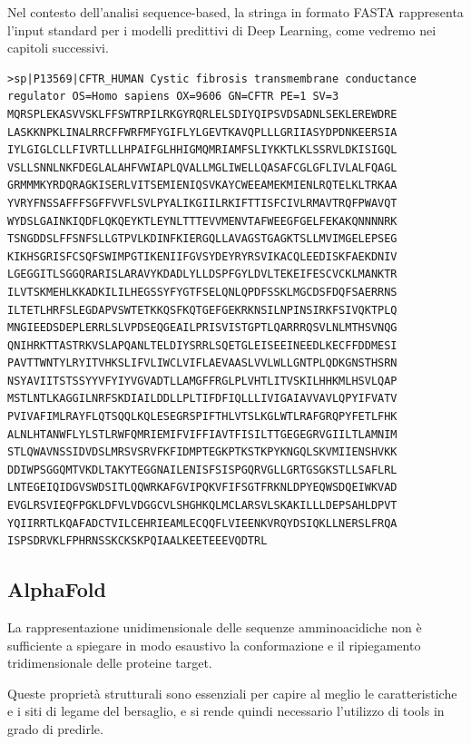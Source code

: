 Nel contesto dell'analisi sequence-based, la stringa in formato FASTA rappresenta l'input standard per i modelli predittivi di Deep Learning, come vedremo nei capitoli successivi.
\clearpage
\begin{lstlisting}[caption={Sequenza FASTA ufficiale della proteina CFTR (Cystic fibrosis transmembrane conductance regulator) umana (UniProt P13569).}, label={lst:fasta_cftr}]
>sp|P13569|CFTR_HUMAN Cystic fibrosis transmembrane conductance regulator OS=Homo sapiens OX=9606 GN=CFTR PE=1 SV=3
MQRSPLEKASVVSKLFFSWTRPILRKGYRQRLELSDIYQIPSVDSADNLSEKLEREWDRE
LASKKNPKLINALRRCFFWRFMFYGIFLYLGEVTKAVQPLLLGRIIASYDPDNKEERSIA
IYLGIGLCLLFIVRTLLLHPAIFGLHHIGMQMRIAMFSLIYKKTLKLSSRVLDKISIGQL
VSLLSNNLNKFDEGLALAHFVWIAPLQVALLMGLIWELLQASAFCGLGFLIVLALFQAGL
GRMMMKYRDQRAGKISERLVITSEMIENIQSVKAYCWEEAMEKMIENLRQTELKLTRKAA
YVRYFNSSAFFFSGFFVVFLSVLPYALIKGIILRKIFTTISFCIVLRMAVTRQFPWAVQT
WYDSLGAINKIQDFLQKQEYKTLEYNLTTTEVVMENVTAFWEEGFGELFEKAKQNNNNRK
TSNGDDSLFFSNFSLLGTPVLKDINFKIERGQLLAVAGSTGAGKTSLLMVIMGELEPSEG
KIKHSGRISFCSQFSWIMPGTIKENIIFGVSYDEYRYRSVIKACQLEEDISKFAEKDNIV
LGEGGITLSGGQRARISLARAVYKDADLYLLDSPFGYLDVLTEKEIFESCVCKLMANKTR
ILVTSKMEHLKKADKILILHEGSSYFYGTFSELQNLQPDFSSKLMGCDSFDQFSAERRNS
ILTETLHRFSLEGDAPVSWTETKKQSFKQTGEFGEKRKNSILNPINSIRKFSIVQKTPLQ
MNGIEEDSDEPLERRLSLVPDSEQGEAILPRISVISTGPTLQARRRQSVLNLMTHSVNQG
QNIHRKTTASTRKVSLAPQANLTELDIYSRRLSQETGLEISEEINEEDLKECFFDDMESI
PAVTTWNTYLRYITVHKSLIFVLIWCLVIFLAEVAASLVVLWLLGNTPLQDKGNSTHSRN
NSYAVIITSTSSYYVFYIYVGVADTLLAMGFFRGLPLVHTLITVSKILHHKMLHSVLQAP
MSTLNTLKAGGILNRFSKDIAILDDLLPLTIFDFIQLLLIVIGAIAVVAVLQPYIFVATV
PVIVAFIMLRAYFLQTSQQLKQLESEGRSPIFTHLVTSLKGLWTLRAFGRQPYFETLFHK
ALNLHTANWFLYLSTLRWFQMRIEMIFVIFFIAVTFISILTTGEGEGRVGIILTLAMNIM
STLQWAVNSSIDVDSLMRSVSRVFKFIDMPTEGKPTKSTKPYKNGQLSKVMIIENSHVKK
DDIWPSGGQMTVKDLTAKYTEGGNAILENISFSISPGQRVGLLGRTGSGKSTLLSAFLRL
LNTEGEIQIDGVSWDSITLQQWRKAFGVIPQKVFIFSGTFRKNLDPYEQWSDQEIWKVAD
EVGLRSVIEQFPGKLDFVLVDGGCVLSHGHKQLMCLARSVLSKAKILLLDEPSAHLDPVT
YQIIRRTLKQAFADCTVILCEHRIEAMLECQQFLVIEENKVRQYDSIQKLLNERSLFRQA
ISPSDRVKLFPHRNSSKCKSKPQIAALKEETEEEVQDTRL
\end{lstlisting}
\subsection{AlphaFold}
La rappresentazione unidimensionale delle sequenze amminoacidiche non è sufficiente a spiegare in modo esaustivo la conformazione e il ripiegamento tridimensionale delle proteine target.

Queste proprietà strutturali sono essenziali per capire al meglio le caratteristiche e i siti di legame del bersaglio, e si rende quindi necessario l'utilizzo di tools in grado di predirle.

